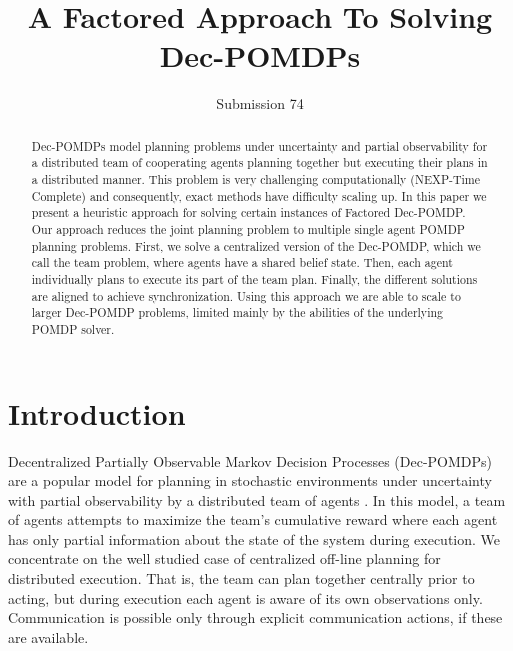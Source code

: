 \documentclass[letterpaper]{article}
\title{A Factored Approach To Solving Dec-POMDPs }
\author{Submission 74}
\theoremstyle{definition}
\begin{document}
\maketitle

\begin{abstract}
Dec-POMDPs model planning problems under uncertainty and partial observability for a distributed team of cooperating agents planning together but executing their plans in a distributed manner. This problem is
very challenging computationally (NEXP-Time Complete) and consequently, exact methods have difficulty scaling up. In this paper we present a heuristic approach for solving certain instances of Factored Dec-POMDP. Our approach reduces the joint planning problem to multiple single agent POMDP planning problems.
First, we solve a centralized version of the Dec-POMDP, which we call the team problem, where agents have a shared belief state. Then, each agent individually plans to execute its part of the team plan. Finally, the different solutions are aligned to achieve synchronization. Using this approach we are able to scale to larger Dec-POMDP problems, limited mainly by the abilities of the underlying POMDP solver.
\end{abstract}




\section{Introduction}

Decentralized Partially Observable Markov Decision Processes (Dec-POMDPs) are a popular model for planning in stochastic environments under uncertainty with partial observability by a distributed team of agents \cite{DECPOMDPART}. In this model, a team of agents attempts to maximize the team's cumulative reward where each agent has only partial information about the state of the system during execution.  We concentrate on the
well studied case of centralized off-line planning for distributed execution. 
That is, the team can plan together centrally prior to acting, but during execution each agent is aware of its own observations only.  Communication is possible only through explicit communication actions, if these are available. 

\end{document}
